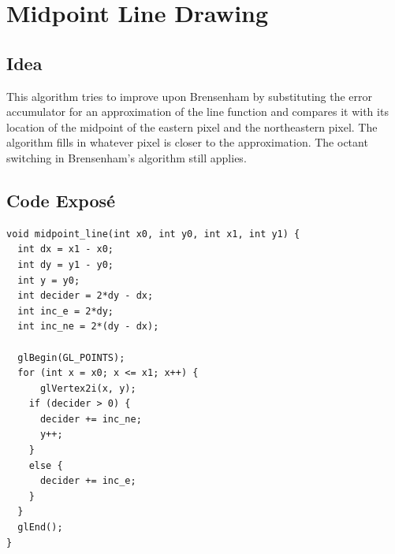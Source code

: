 \documentclass{article}
\begin{document}
\section{Midpoint Line Drawing}
\label{sec:orgheadline9}
\subsection{Idea}
\label{sec:orgheadline6}
This algorithm tries to improve upon Brensenham by substituting the error accumulator
for an approximation of the line function and compares it with its location of the
midpoint of the eastern pixel and the northeastern pixel. The algorithm fills in
whatever pixel is closer to the approximation. The octant switching in Brensenham's
algorithm still applies.
\subsection{Code Exposé}
\label{sec:orgheadline7}
\begin{verbatim}
void midpoint_line(int x0, int y0, int x1, int y1) {
  int dx = x1 - x0;
  int dy = y1 - y0;
  int y = y0;
  int decider = 2*dy - dx;
  int inc_e = 2*dy;
  int inc_ne = 2*(dy - dx);

  glBegin(GL_POINTS);
  for (int x = x0; x <= x1; x++) {
      glVertex2i(x, y);
    if (decider > 0) {
      decider += inc_ne;
      y++;
    }
    else {
      decider += inc_e;
    }
  }
  glEnd();
}
\end{verbatim}
\end{document}

